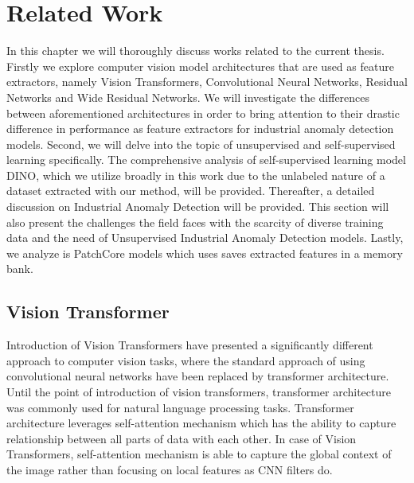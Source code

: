 \chapter{Related Work}
\label{chapter:ch2}
In this chapter we will thoroughly discuss works related to the current thesis. Firstly we explore computer vision model architectures that are used as feature extractors\cite{pre_trained}, namely Vision Transformers\cite{vit}, Convolutional Neural Networks\cite{lenet}, Residual Networks\cite{resnet} and Wide Residual Networks\cite{wideresnet}. We will investigate the differences between aforementioned architectures in order to bring attention to their drastic difference in performance as feature extractors for industrial anomaly detection models. Second, we will delve into the topic of unsupervised\cite{unsupervised_survey} and self-supervised\cite{self_supervised_survey} learning specifically. The comprehensive analysis of self-supervised learning model DINO\cite{dino}, which we utilize broadly in this work due to the unlabeled nature of a dataset extracted with our method, will be provided. Thereafter, a detailed discussion on Industrial Anomaly Detection will be provided\cite{iad_survey}. This section will also present the challenges the field faces with the scarcity of diverse training data and the need of Unsupervised Industrial Anomaly Detection models. Lastly, we analyze is PatchCore models which uses saves extracted features in a memory bank.

\section{Vision Transformer}
\label{vit}
Introduction of Vision Transformers\cite{vit} have presented a significantly different approach to computer vision tasks, where the standard approach of using convolutional neural networks\cite{lenet} have been replaced by transformer\cite{transformer} architecture. Until the point of introduction of vision transformers, transformer architecture was commonly used for natural language processing\cite{natural_language}\cite{transformer} tasks. Transformer architecture leverages self-attention\cite{transformer} mechanism which has the ability to capture relationship between all parts of data with each other. In case of Vision Transformers, self-attention mechanism is able to capture the global context of the image rather than focusing on local features\cite{vit} as CNN\cite{lenet} filters do.

